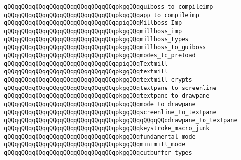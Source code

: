\verb|qQQqqQQqqQQqqQQqqQQqqQQqqQQqqQQqpkgqQQqguiboss_to_compileimp|\newline
\verb|qQQqqQQqqQQqqQQqqQQqqQQqqQQqqQQqpkgqQQqapp_to_compileimp|\newline
\newline
\verb|qQQqqQQqqQQqqQQqqQQqqQQqqQQqqQQqapiqQQqMillboss_Imp|\newline
\verb|qQQqqQQqqQQqqQQqqQQqqQQqqQQqqQQqpkgqQQqmillboss_imp|\newline
\verb|qQQqqQQqqQQqqQQqqQQqqQQqqQQqqQQqpkgqQQqmillboss_types|\newline
\verb|qQQqqQQqqQQqqQQqqQQqqQQqqQQqqQQqpkgqQQqmillboss_to_guiboss|\newline
\newline
\verb|qQQqqQQqqQQqqQQqqQQqqQQqqQQqqQQqpkgqQQqmodes_to_preload|\newline
\newline
\verb|qQQqqQQqqQQqqQQqqQQqqQQqqQQqqQQqapiqQQqTextmill|\newline
\verb|qQQqqQQqqQQqqQQqqQQqqQQqqQQqqQQqpkgqQQqtextmill|\newline
\verb|qQQqqQQqqQQqqQQqqQQqqQQqqQQqqQQqpkgqQQqtextmill_crypts|\newline
\newline
\verb|qQQqqQQqqQQqqQQqqQQqqQQqqQQqqQQqpkgqQQqtextpane_to_screenline|\newline
\verb|qQQqqQQqqQQqqQQqqQQqqQQqqQQqqQQqpkgqQQqtextpane_to_drawpane|\newline
\verb|qQQqqQQqqQQqqQQqqQQqqQQqqQQqqQQqpkgqQQqmode_to_drawpane|\newline
\newline
\verb|qQQqqQQqqQQqqQQqqQQqqQQqqQQqqQQqpkgqQQqscreenline_to_textpane|\newline
\verb|qQQqqQQqqQQqqQQqqQQqqQQqqQQqqQQqpkgqQQqqQQqqQQqdrawpane_to_textpane|\newline
\newline
\newline
\newline
\newline
\newline
\verb|qQQqqQQqqQQqqQQqqQQqqQQqqQQqqQQqpkgqQQqkeystroke_macro_junk|\newline
\verb|qQQqqQQqqQQqqQQqqQQqqQQqqQQqqQQqpkgqQQqfundamental_mode|\newline
\verb|qQQqqQQqqQQqqQQqqQQqqQQqqQQqqQQqpkgqQQqminimill_mode|\newline
\verb|qQQqqQQqqQQqqQQqqQQqqQQqqQQqqQQqpkgqQQqcutbuffer_types|\newline
